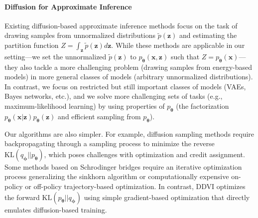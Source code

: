 \documentclass[letterpaper]{article} %
\newcommand{\bx}{\mathbf{x}}
\newcommand{\bz}{\mathbf{z}}
\newcommand{\by}{\mathbf{y}}
\newcommand\KL{\text{KL}}
\let\oldtheta\theta
\renewcommand{\theta}{{\boldsymbol \oldtheta}}
\let\oldphi\phi
\renewcommand{\phi}{{\boldsymbol \oldphi}}
\begin{document}
\paragraph{Diffusion for Approximate Inference}
Existing diffusion-based approximate inference methods \cite{berner2022optimal, zhang2021path, vargas2023denoising, zhang2023diffusion, richter2023improved, sendera2024diffusion, akhound2024iterated} 
focus on the task of drawing samples from unnormalized distributions $\tilde p(\bz)$ and estimating the partition function $Z = \int_\bz \tilde p(\bz) d\bz$. 
While these methods are applicable in our setting---we set the unnormalized $\tilde p(\bz)$ to $p_\theta(\bx,\bz)$ such that $Z = p_\theta(\bx)$---they also tackle a more challenging problem (drawing samples from energy-based models) in more general classes of models (arbitrary unnormalized distributions).
%
In contrast, we focus on restricted but still important classes of models (VAEs, Bayes networks, etc.), and we solve more challenging sets of tasks (e.g., maximum-likelihood learning) by using properties of $p_\theta$ (the factorization $p_\theta(\bx|\bz)p_\theta(\bz)$ and efficient sampling from $p_\theta$). 

Our algorithms are also simpler. For example, diffusion sampling methods require backpropagating through a sampling process to minimize the reverse $\text{KL} (q_\phi || p_\theta)$, which poses challenges with optimization and credit assignment. Some methods based on Schrodinger bridges require an iterative optimization process generalizing the sinkhorn algorithm or computationally expensive on-policy or off-policy \cite{malkin2022trajectory} trajectory-based optimization. In contrast, DDVI optimizes the forward $\text{KL} (p_\theta || q_\phi)$ using simple gradient-based optimization that directly emulates diffusion-based training.



\end{document}
